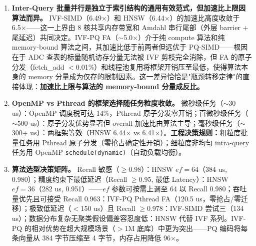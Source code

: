 \documentclass[UTF8,a4paper,10pt]{ctexart}
\begin{document}
\begin{enumerate}
\item \textbf{Inter-Query 批量并行是独立于索引结构的通用有效范式，但加速比上限因算法而异。} IVF-SIMD（6.49×）和 HNSW（6.44×）的加速比高度收敛于 6.5×——这一上界由 8 核共享内存带宽和 Amdahl 串行尾部（外层 barrier + 尾延迟）共同决定。IVF-PQ FA（$\sim$5.0×）介于纯 compute 算法和纯 memory-bound 算法之间，其加速比低于前两者但远优于 PQ-SIMD——根因在于 ADC 查表的标量随机访存分量无法被 IVF 剪枝完全消除，但 FA 的原子分发（fetch\_add $<$0.01\%）和线程池复用将框架开销压至最低，使得算法本身的 memory 分量成为仅存的限制因素。这一差异恰恰是"瓶颈转移定律"的直接体现：\textbf{加速比上限与算法的 memory-bound 分量成反比。}


\item \textbf{OpenMP vs Pthread 的框架选择随任务粒度收敛。} 微秒级任务（$\sim$30 us）：OpenMP 调度税可达 14\%，Pthread 原子分发零开销；百微秒级任务（$\sim$500 us）：原子分发优势显著但 overall 加速比由算法主导；毫秒级任务（$\sim$300+ us）：两框架等效（HNSW 6.44× vs 6.41×）。\textbf{工程决策规则：}粗粒度批量任务用 Pthread 原子分发（零抢占确定性开销）；细粒度非均匀 intra-query 任务用 OpenMP \texttt{schedule(dynamic)}（自动负载均衡）。



\item \textbf{算法选型决策矩阵。} Recall 敏感（$\ge$0.98）：HNSW $ef=64$（384 us, 0.980）；精度约束下最低延迟（Recall $\ge$0.95, 最低 Latency）：HNSW $ef=36$（282 us, 0.951）——$ef$ 参数可按需上调至 64 以 Recall 0.980；吞吐量优先且可接受 Recall 0.963：IVF-PQ Pthread FA（120.5 us，零抢占/零迁移）；极致低延迟（$<$150 us）且 Recall $\ge$0.978：IVF-SIMD 尝试三（134 us）；数据分布复杂无聚类假设偏差容忍度低：HNSW 代替 IVF 系列。IVF-PQ 的相对优势在超大规模场景（$>$1M 底库）中更为突出——PQ 编码将每条向量从 384 字节压缩至 4 字节，内存占用降低 96×。
\end{enumerate}
\end{document}
